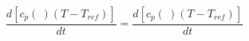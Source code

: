 \begin{equation}
\frac{d [c_p(\ ) (T- T_{ref})]}{dt} = \frac{d [c_p(\ ) (T- T_{ref})]}{dt}
\end{equation}